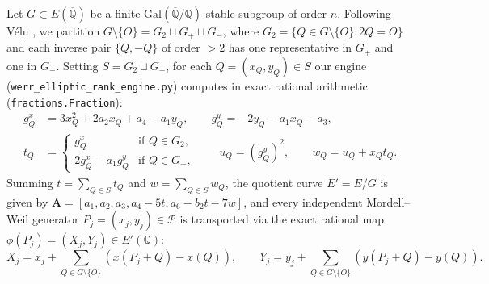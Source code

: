 \documentclass[10pt,a4paper]{article}
\theoremstyle{plain}
\theoremstyle{definition}
\theoremstyle{remark}
\begin{document}
Let $G \subset E(\overline{\mathbb{Q}})$ be a finite $\mathrm{Gal}(\overline{\mathbb{Q}}/\mathbb{Q})$-stable subgroup of order $n$. Following V\'{e}lu \cite{velu1971isogenies}, we partition $G \setminus \{O\} = G_2 \sqcup G_+ \sqcup G_-$, where $G_2 = \{Q \in G \setminus \{O\} : 2Q = O\}$ and each inverse pair $\{Q, -Q\}$ of order $> 2$ has one representative in $G_+$ and one in $G_-$. Setting $S = G_2 \sqcup G_+$, for each $Q = (x_Q, y_Q) \in S$ our engine (\texttt{werr\_elliptic\_rank\_engine.py}) computes in exact rational arithmetic (\texttt{fractions.Fraction}):
\begin{align}
g_Q^x &= 3 x_Q^2 + 2 a_2 x_Q + a_4 - a_1 y_Q, \qquad g_Q^y = -2 y_Q - a_1 x_Q - a_3, \\
t_Q &= \begin{cases} g_Q^x & \text{if } Q \in G_2, \\ 2 g_Q^x - a_1 g_Q^y & \text{if } Q \in G_+, \end{cases} \qquad u_Q = (g_Q^y)^2, \qquad w_Q = u_Q + x_Q t_Q.
\end{align}
Summing $t = \sum_{Q \in S} t_Q$ and $w = \sum_{Q \in S} w_Q$, the quotient curve $E' = E/G$ is given by $\mathbf{A} = [a_1, a_2, a_3, a_4 - 5t, a_6 - b_2 t - 7w]$, and every independent Mordell--Weil generator $P_j = (x_j, y_j) \in \mathcal{P}$ is transported via the exact rational map $\phi(P_j) = (X_j, Y_j) \in E'(\mathbb{Q})$:
\begin{equation}\label{eq:velu_transport}
X_j = x_j + \sum_{Q \in G \setminus \{O\}} \left( x(P_j + Q) - x(Q) \right), \qquad Y_j = y_j + \sum_{Q \in G \setminus \{O\}} \left( y(P_j + Q) - y(Q) \right).
\end{equation}
\end{document}
